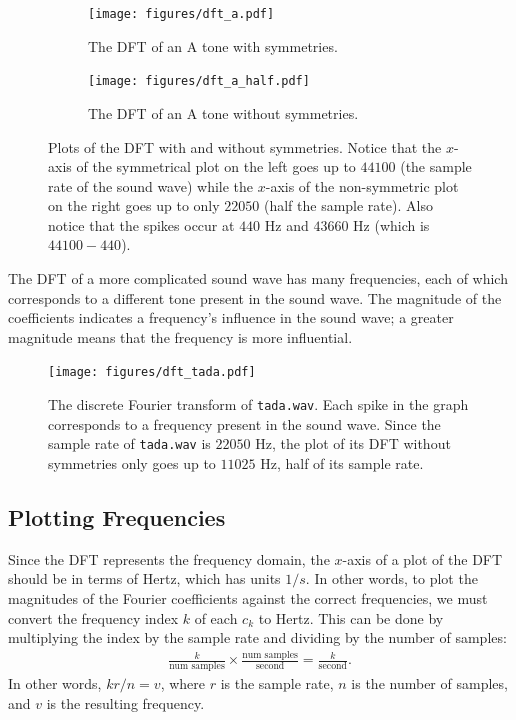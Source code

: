 \begin{figure}[H]
\captionsetup[subfigure]{justification=centering}
\centering
\begin{subfigure}{.49\textwidth}
    \centering
    \texttt{[image: figures/dft\_a.pdf]}
    \caption{The DFT of an A tone with symmetries.}
    \label{fig:dft_a}
\end{subfigure}
\begin{subfigure}{.49\textwidth}
    \centering
    \texttt{[image: figures/dft\_a\_half.pdf]}
    \caption{The DFT of an A tone without symmetries.}
    \label{fig:dft_a_half}
\end{subfigure}
\caption{Plots of the DFT with and without symmetries.
Notice that the $x$-axis of the symmetrical plot on the left goes up to $44100$ (the sample rate of the sound wave) while the $x$-axis of the non-symmetric plot on the right goes up to only $22050$ (half the sample rate).
Also notice that the spikes occur at $440$ Hz and $43660$ Hz (which is $44100 - 440$).}
\end{figure}

The DFT of a more complicated sound wave has many frequencies, each of which corresponds to a different tone present in the sound wave.
The magnitude of the coefficients indicates a frequency's influence in the sound wave; a greater magnitude means that the frequency is more influential.

\begin{figure}[H]
\centering
\texttt{[image: figures/dft\_tada.pdf]}
\caption{The discrete Fourier transform of \texttt{tada.wav}.
Each spike in the graph corresponds to a frequency present in the sound wave.
Since the sample rate of \texttt{tada.wav} is $22050$ Hz, the plot of its DFT without symmetries only goes up to $11025$ Hz, half of its sample rate.}
\label{fig:dft_tada}
\end{figure}

\subsection*{Plotting Frequencies} %

Since the DFT represents the frequency domain, the $x$-axis of a plot of the DFT should be in terms of Hertz, which has units $1/s$.
In other words, to plot the magnitudes of the Fourier coefficients against the correct frequencies, we must convert the frequency index $k$ of each $c_k$ to Hertz.
This can be done by multiplying the index by the sample rate and dividing by the number of samples:
\begin{align}
\label{eq:fft-cycles-conversion}
\frac{k}{\mbox{num samples}} \times \frac{\mbox{num samples}}{\mbox{second}}
= \frac{k}{\mbox{second}}.
\end{align}
In other words, $kr/n = v$, where $r$ is the sample rate, $n$ is the number of samples, and $v$ is the resulting frequency.

